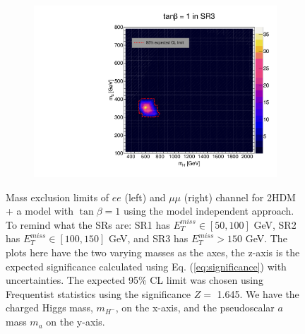\documentclass[12pt, a4paper]{book}
\begin{document}
\begin{figure}[!ht]
\begin{subfigure}[b]{0.49\textwidth}
   \end{subfigure}
   \hfill
   \begin{subfigure}[b]{0.49\textwidth}
      \centering
      \includegraphics[width=1\textwidth]{Limits/Model_independent/150/2HDM/2HDM_uu_tb1.pdf}
   \end{subfigure}
   \caption[Expected mass exclusion limits results for the 2HDM + a model with $\tan\beta=5$ on $ee$ and $\mu\mu$ channel using the model independent approach]{Mass exclusion limits of $ee$ (left) and $\mu\mu$ (right) channel for 2HDM + a model with $\tan\beta=1$ using the model independent approach. To remind what the SRs are: SR1 has $E_T^{miss}\in[50, 100]$ GeV, SR2 has $E_T^{miss}\in[100, 150]$ GeV, and SR3 has $E_T^{miss}>150$ GeV. The plots here have the two varying masses as the axes, the z-axis is the expected significance calculated using Eq. (\ref{eq:significance}) with uncertainties. The expected 95\% CL limit was chosen using Frequentist statistics using the significance $Z=$ 1.645.   
   We have the charged Higgs mass, $m_{H^-}$, on the x-axis, and the pseudoscalar $a$ mass $m_{a}$ on the y-axis.}
\end{figure}

\clearpage
\end{document}
